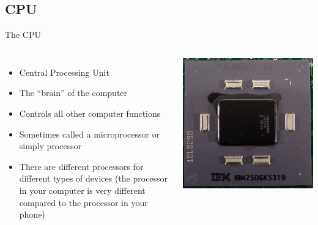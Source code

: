 \documentclass[graphics]{beamer}
\begin{document}
\subsection{CPU}
\begin{frame}{The CPU}
\begin{columns}
    \begin{itemize}
        \item Central Processing Unit
        \item The ``brain'' of the computer
        \item Controls all other computer functions
        \item Sometimes called a microprocessor or simply processor
        \item There are different processors for different types of devices (the processor in your computer is very different compared to the processor in your phone)
    \end{itemize}
    \includegraphics[scale=0.6]{L02_ArchNumbersSystems/L2_p8_cpu.png}
    \end{columns}
\end{frame}
\end{document}
